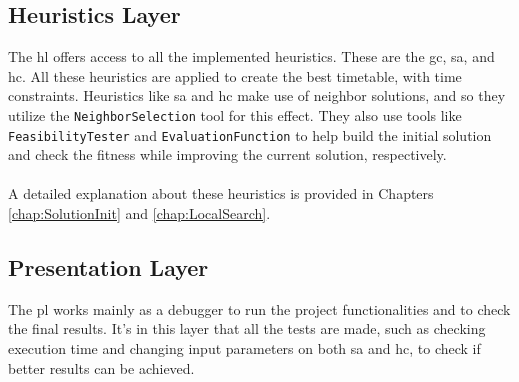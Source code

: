 \subsection{Heuristics Layer}

The \gls{hl} offers access to all the implemented heuristics. These are the \gls{gc}, \gls{sa}, and \gls{hc}. All these heuristics are applied to create the best timetable, with time constraints. Heuristics like \gls{sa} and \gls{hc} make use of neighbor solutions, and so they utilize the \verb+NeighborSelection+ tool for this effect. They also use tools like \verb+FeasibilityTester+ and \verb+EvaluationFunction+ to help build the initial solution and check the fitness while improving the current solution, respectively.\\
\\
A detailed explanation about these heuristics is provided in Chapters \ref{chap:SolutionInit} and \ref{chap:LocalSearch}.

\subsection{Presentation Layer}

The \gls{pl} works mainly as a debugger to run the project functionalities and to check the final results. It's in this layer that all the tests are made, such as checking execution time and changing input parameters on both \gls{sa} and \gls{hc}, to check if better results can be achieved.











